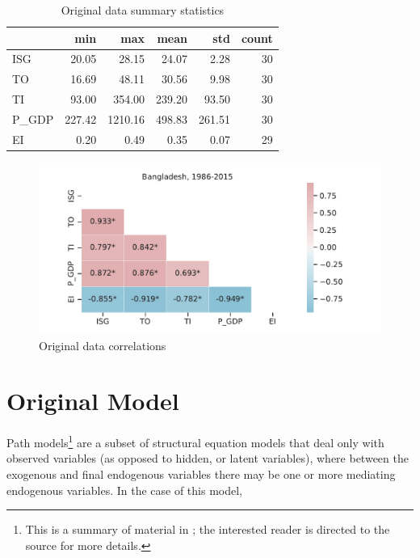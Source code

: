 \documentclass[11pt]{article}
\begin{document}
\begin{table}[htbp]
\centering
\begin{tabular}{lrrrrr}
\toprule
{} &    min &     max &   mean &    std &  count \\
\midrule
ISG   &  20.05 &   28.15 &  24.07 &   2.28 &     30 \\
TO    &  16.69 &   48.11 &  30.56 &   9.98 &     30 \\
TI    &  93.00 &  354.00 & 239.20 &  93.50 &     30 \\
P\_GDP & 227.42 & 1210.16 & 498.83 & 261.51 &     30 \\
EI    &   0.20 &    0.49 &   0.35 &   0.07 &     29 \\
\bottomrule
\end{tabular}
\caption{Original data summary statistics}
\label{tab:original_summary_stats}
\end{table}


\begin{figure}[htbp]
\centering
\includegraphics[width=\textwidth]{./plots/BGD_201805_correlations.pdf}
\caption{Original data correlations}
\label{fig:original_summary_corr}
\end{figure}

\section{Original Model}\label{sec:original_model}

Path models\footnote{ 
This is a summary of material in \cite{klinePrinciplesPracticeStructural2016}; the interested reader is directed to the source for more details.
} are a subset of structural equation models that deal only with observed variables (as opposed to hidden, or latent variables), where between the exogenous and final endogenous variables there may be one or more mediating endogenous variables.
In the case of this model, 
\end{document}
